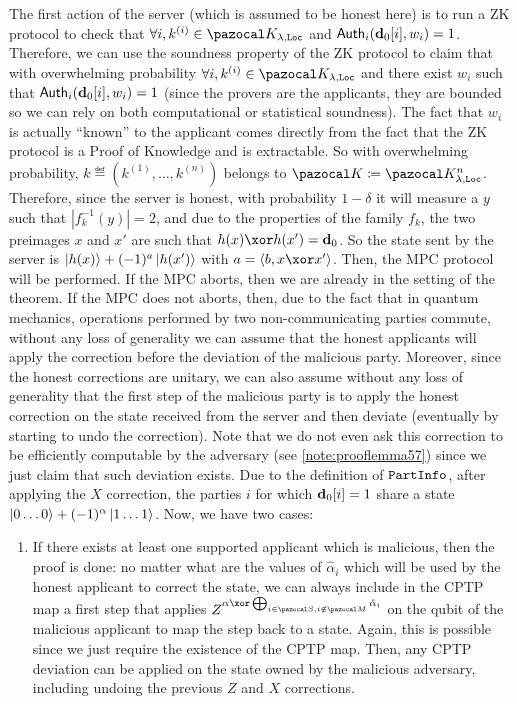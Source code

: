 \begin{proofE}
 The first action of the server (which is assumed to be honest here) is to run a ZK protocol to check that $\forall i, k^{(i)} \in \cK_{\lambda,\texttt{Loc}}$ and ${\sf Auth}_i(\mathbf{d}_0[i],w_i)=1$. Therefore, we can use the soundness property of the ZK protocol to claim that with overwhelming probability $\forall i, k^{(i)} \in \cK_{\lambda,\texttt{Loc}}$ and there exist $w_i$ such that ${\sf Auth}_i(\mathbf{d}_0[i],w_i)=1$ (since the provers are the applicants, they are bounded so we can rely on both computational or statistical soundness). The fact that $w_i$ is actually ``known'' to the applicant comes directly from the fact that the ZK protocol is a Proof of Knowledge and is extractable. So with overwhelming probability, $k \eqdef (k^{(1)},\dots,k^{(n)})$ belongs to $\cK \eqdef \cK_{\lambda,\texttt{Loc}}^n$. Therefore, since the server is honest, with probability $1-\delta$ it will measure a $y$ such that $|f_k^{-1}(y)|=2$, and due to the properties of the family $f_k$, the two preimages $x$ and $x'$ are such that $h(x) \xor h(x') = \vect{d}_0$. So the state sent by the server is $\ket{h(x)} + (-1)^a\ket{h(x')}$ with $a = \langle b, x \xor x' \rangle$. Then, the MPC protocol will be performed. If the MPC aborts, then we are already in the setting of the theorem. If the MPC does not aborts, then, due to the fact that in quantum mechanics, operations performed by two non-communicating parties commute, without any loss of generality we can assume that the honest applicants will apply the correction before the deviation of the malicious party. Moreover, since the honest corrections are unitary, we can also assume without any loss of generality that the first step of the malicious party is to apply the honest correction on the state received from the server and then deviate (eventually by starting to undo the correction). Note that we do not even ask this correction to be efficiently computable by the adversary (see \cref{note:prooflemma57}) since we just claim that such deviation exists. Due to the definition of ${\tt PartInfo}$, after applying the $X$ correction, the parties $i$ for which $\mathbf{d}_0[i]=1$ share a state $\ket{0 \dots 0} + (-1)^\alpha\ket{1 \dots 1}$. Now, we have two cases:
  \begin{enumerate}
    \item If there exists at least one supported applicant which is malicious, then the proof is done: no matter what are the values of $\hat{\alpha}_i$ which will be used by the honest applicant to correct the state, we can always include in the CPTP map a first step that applies $Z^{\alpha \xor\bigoplus_{i \in \cS, i \notin \cM} \hat{\alpha}_i}$ on the qubit of the malicious applicant to map the step back to a \GHZ{} state. Again, this is possible since we just require the existence of the CPTP map. Then, any CPTP deviation can be applied on the state owned by the malicious adversary, including undoing the previous $Z$ and $X$ corrections.

\end{enumerate}
\end{proofE}
